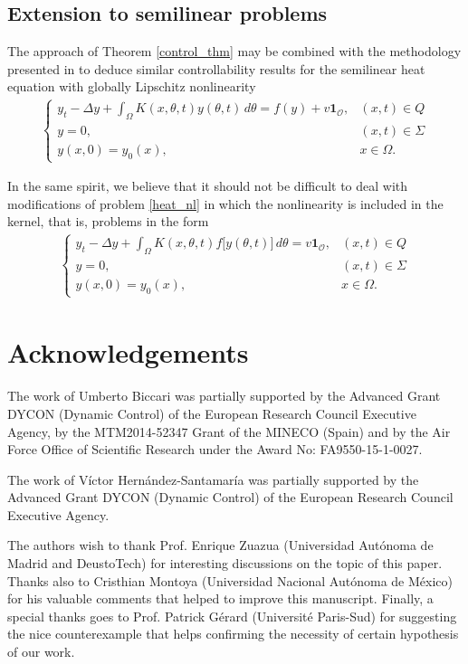 \documentclass[preprint,1p]{elsarticle}
\newcommand{\D}{\displaystyle}
\begin{document}
\subsection{Extension to semilinear problems}

The approach of Theorem \ref{control_thm} may be combined with the methodology presented in \cite{fabre1995approximate,fernandez1997null} to deduce similar controllability results for the semilinear heat equation with globally Lipschitz nonlinearity  
\begin{align}\label{heat_nl}
	\begin{cases}
		\D y_t - \Delta y + \int_\Omega K(x,\theta,t)y(\theta,t)\,d\theta = f(y) + v\mathbf{1}_{\mathcal O}, & (x,t)\in Q
		\\
		y = 0, & (x,t)\in\Sigma
		\\
		y(x,0) = y_0(x), & x\in\Omega.
	\end{cases}
\end{align}

In the same spirit, we believe that it should not be difficult to deal with modifications of problem \eqref{heat_nl} in which the nonlinearity is included in the kernel, that is, problems in the form
\begin{align*}
	\begin{cases}
		\D y_t - \Delta y + \int_\Omega K(x,\theta,t)f\big[y(\theta,t)\big]\,d\theta = v\mathbf{1}_{\mathcal O}, & (x,t)\in Q
		\\
		y = 0, & (x,t)\in\Sigma
		\\
		y(x,0) = y_0(x), & x\in\Omega.
	\end{cases}
\end{align*}

\section*{Acknowledgements} 
The work of Umberto Biccari was partially supported by the Advanced Grant DYCON (Dynamic Control) of the European Research Council Executive Agency, by the MTM2014-52347 Grant of the MINECO (Spain) and by the Air Force Office of Scientific Research under the Award No: FA9550-15-1-0027.

The work of V\'ictor Hern\'andez-Santamar\'ia was partially supported by the Advanced Grant DYCON (Dynamic Control) of the European Research Council Executive Agency.

The authors wish to thank Prof. Enrique Zuazua (Universidad Aut\'onoma de Madrid and DeustoTech) for interesting discussions on the topic of this paper. Thanks also to Cristhian Montoya (Universidad Nacional Aut\'onoma de M\'exico) for his valuable comments that helped to improve this manuscript. Finally, a special thanks goes to Prof. Patrick G\'erard (Universit\'e Paris-Sud) for suggesting the nice counterexample that helps confirming the necessity of certain hypothesis of our work.
\end{document}
